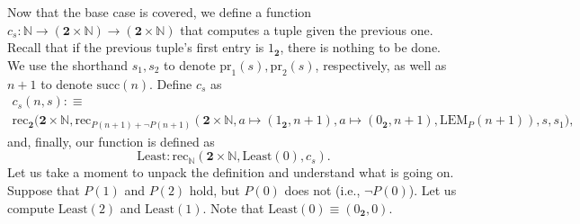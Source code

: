 \documentclass[14pt]{extarticle}
\newcommand{\N}{{\mathbb N}}
\newcommand{\0}{{\mathbf 0}}
\newcommand{\1}{{\mathbf 1}}
\newcommand{\2}{{\mathbf 2}}
\newcommand{\mt}{\mapsto}
\newcommand{\rec}{\mathrm{rec}}
\newcommand{\su}{\mathrm{succ}}
\newcommand{\pr}{\mathrm{pr}}
\newcommand{\LEM}{\mathrm{LEM}}
\begin{document}
Now that the base case is covered, we define a function $c_s : \N \to (\2 \times \N) \to (\2 \times \N)$ that computes a tuple given the previous one. Recall that if the previous tuple's first entry is $1_\2$, there is nothing to be done. We use the shorthand $s_1,s_2$ to denote $\pr_1(s),\pr_2(s)$, respectively, as well as $n+1$ to denote $\su(n)$. Define $c_s$ as
\begin{multline*}
c_s(n,s) :\equiv \\ 
\rec_{\2}\Big(\2 \times \N,\rec_{P(n+1) + \neg P(n+1)}(\2 \times \N,a \mt (1_\2,n+1),a \mt (0_\2,n+1),\LEM_P(n+1)),s,s_1\Big),
\end{multline*}
and, finally, our function is defined as
\[\text{Least} : \rec_\N(\2 \times \N,\text{Least}(0),c_s).\]
Let us take a moment to unpack the definition and understand what is going on. Suppose that $P(1)$ and $P(2)$ hold, but $P(0)$ does not (i.e., $\neg P(0)$). Let us compute $\text{Least}(2)$ and $\text{Least}(1)$. Note that $\text{Least}(0) \equiv (0_\2,0)$.
\end{document}
